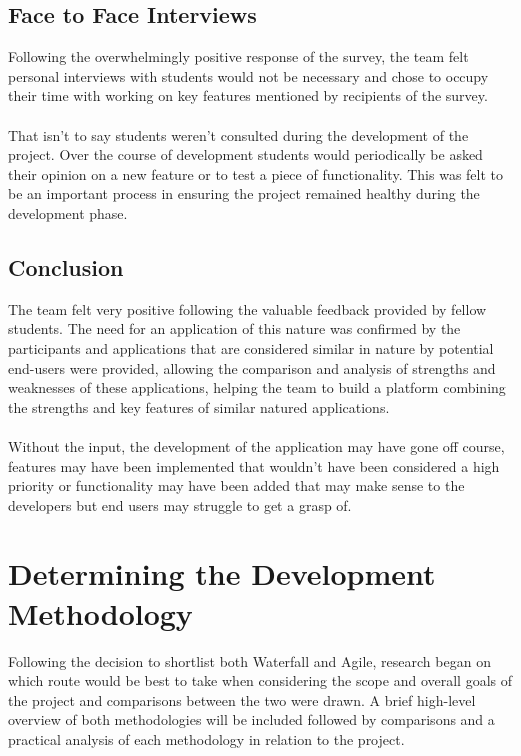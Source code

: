 \subsection{Face to Face Interviews}
Following the overwhelmingly positive response of the survey, the team felt personal interviews with students would not be necessary and chose to occupy their time with working on key features mentioned by recipients of the survey.

\paragraph{}
That isn't to say students weren't consulted during the development of the project. Over the course of development students would periodically be asked their opinion on a new feature or to test a piece of functionality. This was felt to be an important process in ensuring the project remained healthy during the development phase.

\subsection{Conclusion}
The team felt very positive following the valuable feedback provided by fellow students. The need for an application of this nature was confirmed by the participants and applications that are considered similar in nature by potential end-users were provided, allowing the comparison and analysis of strengths and weaknesses of these applications, helping the team to build a platform combining the strengths and key features of similar natured applications.

\paragraph{}
Without the input, the development of the application may have gone off course, features may have been implemented that wouldn't have been considered a high priority or functionality may have been added that may make sense to the developers but end users may struggle to get a grasp of.

\section{Determining the Development Methodology}
Following the decision to shortlist both Waterfall and Agile, research began on which route would be best to take when considering the scope and overall goals of the project and comparisons between the two were drawn. A brief high-level overview of both methodologies will be included followed by comparisons and a practical analysis of each methodology in relation to the project.

